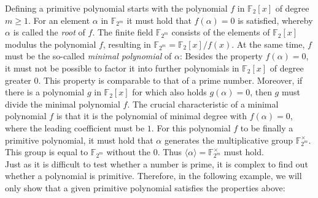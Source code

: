 Defining a primitive polynomial starts with the polynomial $f$ in $\mathbb{F}_2[x]$ of degree $m\ge1$. For an element $\alpha$ in $\mathbb{F}_{2^m}$ it must hold that $f(\alpha)=0$ is satisfied, whereby $\alpha$ is called the \textit{root} of $f$. The finite field $\mathbb{F}_{2^m}$ consists of the elements of $\mathbb{F}_2[x]$ modulus the polynomial $f$, resulting in $\mathbb{F}_{2^m}=\mathbb{F}_2[x]/f(x)$. \cite[p. 11]{Smart.2016} At the same time, $f$ must be the so-called \textit{minimal polynomial} of $\alpha$: Besides the property $f(\alpha)=0$, it must not be possible to factor it into further polynomials in $\mathbb{F}_2[x]$ of degree greater $0$. This property is comparable to that of a prime number. Moreover, if there is a polynomial $g$ in $\mathbb{F}_2[x]$ for which also holds $g(\alpha)=0$, then $g$ must divide the minimal polynomial $f$. The crucial characteristic of a minimal polynomial $f$ is that it is the polynomial of minimal degree with $f(\alpha)=0$, where the leading coefficient must be $1$. For this polynomial $f$ to be finally a primitive polynomial, it must hold that $\alpha$ generates the multiplicative group $\mathbb{F}_{2^m}^\times$. This group is equal to $\mathbb{F}_{2^m}$ without the $0$. Thus $\langle\alpha\rangle=\mathbb{F}_{2^m}^\times$ must hold. \cite[pp. 23, 31, 89]{Lidl.1997} \\

Just as it is difficult to test whether a number is prime, it is complex to find out whether a polynomial is primitive. \cite[p. 431]{Schneier.2006} Therefore, in the following example, we will only show that a given primitive polynomial satisfies the properties above: \\


